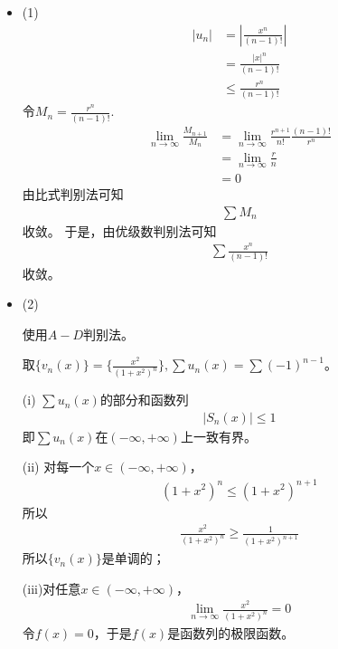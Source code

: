 \documentclass{article}
\begin{document}
\begin{itemize}
  \item (1)
        \begin{align*}
          |u_n|
           & = \left| \frac{x^n}{(n - 1)!} \right| \\
           & = \frac{|x|^n}{(n - 1)!}              \\
           & \leq \frac{r^n}{(n - 1)!}
        \end{align*}
        令$M_n = \frac{r^n}{(n - 1)!}$.
        \begin{align*}
          \lim\limits_{n \to \infty} \frac{M_{n + 1}}{M_{n}}
           & = \lim\limits_{n \to \infty} \frac{r^{n + 1}}{n!}  \frac{(n - 1)!}{r^n} \\
           & = \lim\limits_{n \to \infty} \frac{r}{n}                                \\
           & = 0
        \end{align*}
        由比式判别法可知
        \begin{align*}
          \sum M_n
        \end{align*}
        收敛。
        于是，由优级数判别法可知
        \begin{align*}
          \sum \frac{x^n}{(n - 1)!}
        \end{align*}
        收敛。

  \item (2)

        使用$A-D$判别法。

        取$\{v_n(x)\} = \{\frac{x^2}{(1 + x^2)^n} \}, \sum u_n(x) = \sum (-1)^{n - 1}$。

        (i) $\sum u_n(x)$的部分和函数列
        \begin{align*}
          |S_n(x)| \leq 1
        \end{align*}
        即$\sum u_n(x)$在$(-\infty, +\infty)$上一致有界。

        (ii) 对每一个$x \in (-\infty, +\infty)$，
        \begin{align*}
          (1 + x^2)^n \leq (1 + x^2)^{n + 1}
        \end{align*}
        所以
        \begin{align*}
          \frac{x^2}{(1 + x^2)^n} \geq \frac{1}{(1 + x^2)^{n + 1}}
        \end{align*}
        所以$\{v_n(x)\}$是单调的；

        (iii)对任意$x \in (-\infty, +\infty)$，
        \begin{align*}
          \lim\limits_{n \to \infty} \frac{x^2}{(1 + x^2)^n} = 0
        \end{align*}
        令$f(x) = 0$，于是$f(x)$是函数列的极限函数。


\end{itemize}
\end{document}
